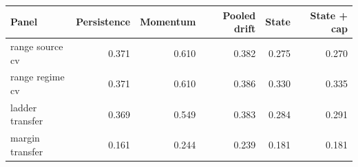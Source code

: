 \begin{tabular}{lrrrrr}
\toprule
Panel & Persistence & Momentum & Pooled drift & State & State + cap \\
\midrule
range source cv & 0.371 & 0.610 & 0.382 & 0.275 & 0.270 \\
range regime cv & 0.371 & 0.610 & 0.386 & 0.330 & 0.335 \\
ladder transfer & 0.369 & 0.549 & 0.383 & 0.284 & 0.291 \\
margin transfer & 0.161 & 0.244 & 0.239 & 0.181 & 0.181 \\
\bottomrule
\end{tabular}
